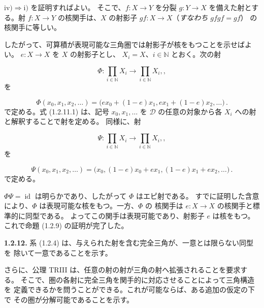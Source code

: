\clearpage
{}%
\begingroup
\small
\setlength{\emergencystretch}{1.5em}%
\setlength{\abovedisplayskip}{4pt plus 2pt minus 2pt}%
\setlength{\belowdisplayskip}{4pt plus 2pt minus 2pt}%

$\mathrm{iv)}\Longrightarrow\mathrm{i)}$ を証明すればよい。
そこで、$f\colon X\longrightarrow Y$ を分裂
$g\colon Y\longrightarrow X$ を備えた射とする。射
$f\colon X\longrightarrow Y$ の核関手は、$X$ の射影子
$gf\colon X\longrightarrow X$（{\itshape すなわち} $gfgf=gf$）
の核関手に等しい。

したがって、可算積が表現可能な三角圏では射影子が核をもつことを示せばよい。
$e\colon X\longrightarrow X$ を $X$ の射影子とし、
$X_i=X$、$i\in\mathbb N$ とおく。次の射

\[
  \Phi\colon\prod_{i\in\mathbb N}X_i\longrightarrow
  \prod_{i\in\mathbb N}X_i, ,
\]
を

\begin{equation}
  \Phi(x_0,x_1,x_2,\ldots)
  =\bigl(ex_0+(1-e)x_1,ex_1+(1-e)x_2,\ldots\bigr)\,.
  \tag{1.2.11.1}
\end{equation}
で定める。式 (1.2.11.1) は、記号 $x_0,x_1,\ldots$ を
$\mathcal D$ の任意の対象から各 $X_i$ への射と解釈することで射を定める。
同様に、射

\[
  \Psi\colon\prod_{i\in\mathbb N}X_i\longrightarrow
  \prod_{i\in\mathbb N}X_i, ,
\]
を

\begin{equation}
  \Psi(x_0,x_1,x_2,\ldots)
  =\bigl(x_0,(1-e)x_0+ex_1,(1-e)x_1+ex_2,\ldots\bigr)\,.
  \tag{1.2.11.2}
\end{equation}
で定める。

$\Phi\Psi=\operatorname{id}$ は明らかであり、したがって $\Phi$ はエピ射である。
すでに証明した含意により、$\Phi$ は表現可能な核をもつ。一方、$\Phi$ の
核関手は $e\colon X\longrightarrow X$ の核関手と標準的に同型である。
よってこの関手は表現可能であり、射影子 $e$ は核をもつ。
これで命題 (1.2.9) の証明が完了した。

\medskip
\noindent\textbf{1.2.12.}\quad
系 (1.2.4) は、与えられた射を含む完全三角が、一意とは限らない同型を
除いて一意であることを示す。

さらに、公理 TRIII は、任意の射の射が三角の射へ拡張されることを要求する。
そこで、圏の各射に完全三角を関手的に対応させることによって三角構造を
定義できるかを問うことができる。これが可能ならば、ある追加の仮定の下で
その圏が分解可能であることを示す。

